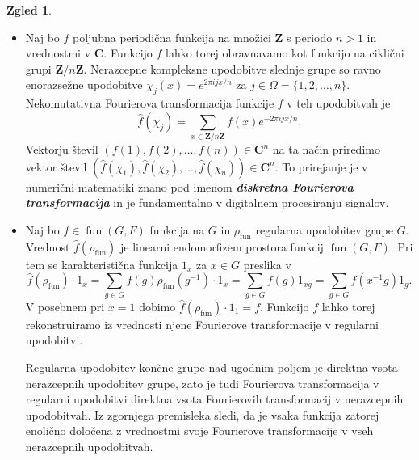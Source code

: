 \documentclass[11pt]{book}
\def\ZZ{\mathbf{Z}}
\def\CC{\mathbf{C}}
\DeclareMathOperator\fun{fun}
\def\definicija{\color{rdeca}\bf\em}
\theoremstyle{definition}
\theoremstyle{zgled}
\newtheorem*{zgled}{Zgled}
\theoremstyle{odprtproblem}
\theoremstyle{domacanaloga}
\theoremstyle{izrek}
\begin{document}
\begin{zgled} \leavevmode
\begin{itemize}
    \item Naj bo $f$ poljubna periodična funkcija na množici $\ZZ$ s periodo $n > 1$ in vrednostmi v $\CC$. Funkcijo $f$ lahko torej obravnavamo kot funkcijo na ciklični grupi $\ZZ/n\ZZ$. Nerazcepne kompleksne upodobitve slednje grupe so ravno enorazsežne upodobitve $\chi_j(x) = e^{2 \pi i j x / n}$ za $j \in \Omega = \{ 1, 2, \dots, n \}$. Nekomutativna Fourierova transformacija funkcije $f$ v teh upodobitvah je
    \[
        \hat{f}(\chi_j) = \sum_{x \in \ZZ/n\ZZ} f(x) e^{- 2 \pi i j x / n }.
    \]
    Vektorju števil $(f(1), f(2), \dots, f(n)) \in \CC^n$ na ta način priredimo vektor števil $(\hat{f}(\chi_1), \hat{f}(\chi_2), \dots, \hat{f}(\chi_n)) \in \CC^n$. To prirejanje je v numerični matematiki znano pod imenom {\definicija diskretna Fourierova transformacija} in je fundamentalno v digitalnem procesiranju signalov.

    \item Naj bo $f \in \fun(G,F)$ funkcija na $G$ in $\rho_{\fun}$ regularna upodobitev grupe $G$. Vrednost $\hat{f}(\rho_{\fun})$ je linearni endomorfizem prostora funkcij $\fun(G,F)$. Pri tem se karakteristična funkcija $1_x$ za $x \in G$ preslika v
\[
    \hat{f}(\rho_{\fun}) \cdot 1_x 
    = \sum_{g \in G} f(g) \rho_{\fun}(g^{-1}) \cdot 1_x
    = \sum_{g \in G} f(g) 1_{xg}
    = \sum_{g \in G} f(x^{-1}g) 1_{g}.
\] 
V posebnem pri $x = 1$ dobimo $\hat{f}(\rho_{\fun}) \cdot 1_1 = f$. Funkcijo $f$ lahko torej rekonstruiramo iz vrednosti njene Fourierove transformacije v regularni upodobitvi. 

Regularna upodobitev končne grupe nad ugodnim poljem je direktna vsota nerazcepnih upodobitev grupe, zato je tudi Fourierova transformacija v regularni upodobitvi direktna vsota Fourierovih transformacij v nerazcepnih upodobitvah. Iz zgornjega premisleka sledi, da je vsaka funkcija zatorej enolično določena z vrednostmi svoje Fourierove transformacije v vseh nerazcepnih upodobitvah.
\end{itemize}
\end{zgled}
\end{document}
